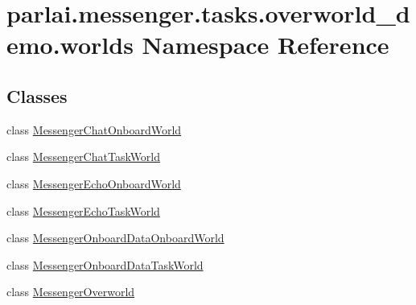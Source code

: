 \hypertarget{namespaceparlai_1_1messenger_1_1tasks_1_1overworld__demo_1_1worlds}{}\section{parlai.\+messenger.\+tasks.\+overworld\+\_\+demo.\+worlds Namespace Reference}
\label{namespaceparlai_1_1messenger_1_1tasks_1_1overworld__demo_1_1worlds}
\subsection*{Classes}
\begin{DoxyCompactItemize}
\item 
class \hyperlink{classparlai_1_1messenger_1_1tasks_1_1overworld__demo_1_1worlds_1_1MessengerChatOnboardWorld}{Messenger\+Chat\+Onboard\+World}
\item 
class \hyperlink{classparlai_1_1messenger_1_1tasks_1_1overworld__demo_1_1worlds_1_1MessengerChatTaskWorld}{Messenger\+Chat\+Task\+World}
\item 
class \hyperlink{classparlai_1_1messenger_1_1tasks_1_1overworld__demo_1_1worlds_1_1MessengerEchoOnboardWorld}{Messenger\+Echo\+Onboard\+World}
\item 
class \hyperlink{classparlai_1_1messenger_1_1tasks_1_1overworld__demo_1_1worlds_1_1MessengerEchoTaskWorld}{Messenger\+Echo\+Task\+World}
\item 
class \hyperlink{classparlai_1_1messenger_1_1tasks_1_1overworld__demo_1_1worlds_1_1MessengerOnboardDataOnboardWorld}{Messenger\+Onboard\+Data\+Onboard\+World}
\item 
class \hyperlink{classparlai_1_1messenger_1_1tasks_1_1overworld__demo_1_1worlds_1_1MessengerOnboardDataTaskWorld}{Messenger\+Onboard\+Data\+Task\+World}
\item 
class \hyperlink{classparlai_1_1messenger_1_1tasks_1_1overworld__demo_1_1worlds_1_1MessengerOverworld}{Messenger\+Overworld}
\end{DoxyCompactItemize}
